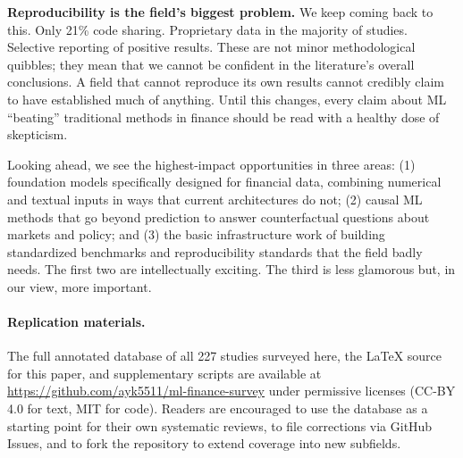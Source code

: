 \textbf{Reproducibility is the field's biggest problem.} We keep coming back to this. Only 21\% code sharing. Proprietary data in the majority of studies. Selective reporting of positive results. These are not minor methodological quibbles; they mean that we cannot be confident in the literature's overall conclusions. A field that cannot reproduce its own results cannot credibly claim to have established much of anything. Until this changes, every claim about ML ``beating'' traditional methods in finance should be read with a healthy dose of skepticism.

Looking ahead, we see the highest-impact opportunities in three areas: (1) foundation models specifically designed for financial data, combining numerical and textual inputs in ways that current architectures do not; (2) causal ML methods that go beyond prediction to answer counterfactual questions about markets and policy; and (3) the basic infrastructure work of building standardized benchmarks and reproducibility standards that the field badly needs. The first two are intellectually exciting. The third is less glamorous but, in our view, more important.

\paragraph{Replication materials.} The full annotated database of all 227 studies surveyed here, the LaTeX source for this paper, and supplementary scripts are available at \url{https://github.com/ayk5511/ml-finance-survey} under permissive licenses (CC-BY 4.0 for text, MIT for code). Readers are encouraged to use the database as a starting point for their own systematic reviews, to file corrections via GitHub Issues, and to fork the repository to extend coverage into new subfields.
